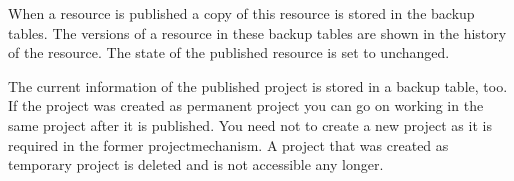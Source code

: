 When a resource is published a copy of this resource is stored in
the backup tables. The versions of a resource in these backup
tables are shown in the  history of the resource.
The state of the published resource is set to unchanged.

The current information of the published project is stored in a
backup table, too. If the project was created as permanent project
you can go on working in the same project after it is published.
You need not to create a new project as it is required in the
former projectmechanism. A project that was created as temporary
project is deleted and is not accessible any longer.
